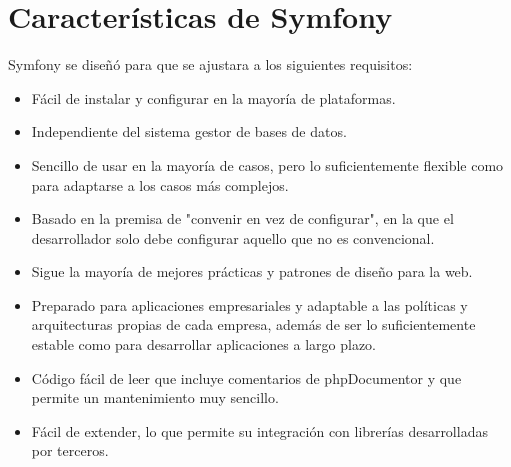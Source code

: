 \section{Características de Symfony}

Symfony se diseñó para que se ajustara a los siguientes requisitos:

\begin{itemize}
    \item Fácil de instalar y configurar en la mayoría de plataformas.
    \item Independiente del sistema gestor de bases de datos.
    \item Sencillo de usar en la mayoría de casos, pero lo suficientemente flexible como para adaptarse a los casos más complejos.
    \item Basado en la premisa de "convenir en vez de configurar", en la que el desarrollador solo debe configurar aquello que no es convencional.
    \item Sigue la mayoría de mejores prácticas y patrones de diseño para la web.
    \item Preparado para aplicaciones empresariales y adaptable a las políticas y arquitecturas propias de cada empresa, además de ser lo suficientemente estable como para desarrollar aplicaciones a largo plazo.
    \item Código fácil de leer que incluye comentarios de phpDocumentor y que permite un mantenimiento muy sencillo.
    \item Fácil de extender, lo que permite su integración con librerías desarrolladas por terceros.
\end{itemize}